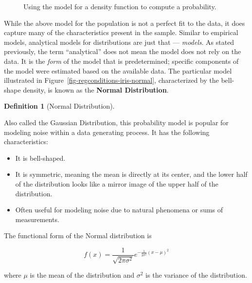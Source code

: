 \documentclass[
  letterpaper,
  DIV=11,
  numbers=noendperiod]{scrreprt}
\providecommand{\tightlist}{%
  \setlength{\itemsep}{0pt}\setlength{\parskip}{0pt}}\usepackage{longtable,booktabs,array}
\theoremstyle{definition}
\newtheorem{definition}{Definition}[chapter]
\theoremstyle{definition}
\theoremstyle{plain}
\theoremstyle{remark}
\begin{document}
\begin{figure}


\caption{\label{fig-regconditions-iris-prob}Using the model for a
density function to compute a probability.}

\end{figure}%

While the above model for the population is not a perfect fit to the
data, it does capture many of the characteristics present in the sample.
Similar to empirical models, analytical models for distributions are
just that --- \emph{models}. As stated previously, the term
``analytical'' does not mean the model does not rely on the data. It is
the \emph{form} of the model that is predetermined; specific components
of the model were estimated based on the available data. The particular
model illustrated in Figure~\ref{fig-regconditions-iris-normal},
characterized by the bell-shape density, is known as the \textbf{Normal
Distribution}.

\begin{definition}[Normal
Distribution]\protect\hypertarget{def-normal-distribution}{}\label{def-normal-distribution}

Also called the Gaussian Distribution, this probability model is popular
for modeling noise within a data generating process. It has the
following characteristics:

\begin{itemize}
\tightlist
\item
  It is bell-shaped.
\item
  It is symmetric, meaning the mean is directly at its center, and the
  lower half of the distribution looks like a mirror image of the upper
  half of the distribution.
\item
  Often useful for modeling noise due to natural phenomena or sums of
  measurements.
\end{itemize}

The functional form of the Normal distribution is

\[f(x) = \frac{1}{\sqrt{2\pi\sigma^2}} e^{-\frac{1}{2\sigma^2}(x - \mu)^2}\]

where \(\mu\) is the mean of the distribution and \(\sigma^2\) is the
variance of the distribution.

\end{definition}
\end{document}
